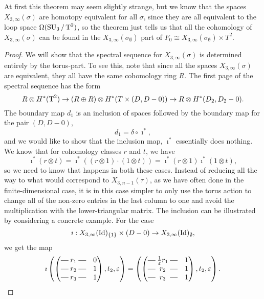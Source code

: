 At first this theorem may seem slightly strange, but we know
that the spaces $X_{3,\infty}(\sigma)$ are homotopy equivalent for all
$\sigma$, since they are all equivalent to the loop space
$\Omega(\operatorname{SU}_3/\operatorname{T}^2)$, so the theorem
just tells us that all the cohomology of $X_{3,\infty}(\sigma)$ can be
found in the $X_{3,\infty}(\sigma_{\emptyset})$ part of $F_0 \cong
X_{3,\infty}(\sigma_{\emptyset})\times T^2$.

\begin{proof}
  We will show that the spectral sequence for $X_{3,\infty}(\sigma)$
  is determined entirely by the torus-part. To see this, note that
  since all the spaces $X_{3,\infty}(\sigma)$ are equivalent, they all
  have the same cohomology ring $R$. The first page of the spectral
  sequence has the form
  \[ R \otimes H^*(\operatorname{T}^2) \to (R\oplus R)\otimes H^*(T\times (D,D-0))
  \to R\otimes H^*(D_2,D_2-0). \]
  The boundary map $d_1$ is an inclusion of spaces
  followed by the boundary map for the pair $(D,D-0)$,
  \[ d_1 = \delta \circ \imath^*, \]
  and we would like to show that the inclusion map, $\imath^*$
  essentially does nothing. We know that for cohomology classes $r$
  and $t$, we have
  \[ \imath^*(r \otimes t) = \imath^*((r\otimes 1)\cdot (1\otimes t))
  = \imath^*(r\otimes 1) \imath^*(1\otimes t), \]
  so we need to know that happens in both these cases. Instead of
  reducing all the way to what would correspond to $X_{3,n-1}(\tau)$,
  as we have often done in the finite-dimensional case, it is in this
  case simpler to only use
  the torus action to change all of
  the non-zero entries in the last column to one and avoid the
  multiplication with the lower-triangular matrix. The inclusion
  can be illustrated by considering a concrete example. For the
  case
  \[\imath : X_{3,\infty}(\operatorname{Id})_{\left\{ 1 \right\}}\times(D-0) \to
  X_{3,\infty}(\operatorname{Id})_{\emptyset}, \]
  we get the map
  \[
  \imath\left(\begin{pmatrix}
      \matrow{r_1} & 0 \\
      \matrow{r_2} & 1 \\
      \matrow{r_3} & 1
    \end{pmatrix}, t_2, \varepsilon\right) = 
  \left(\begin{pmatrix}
      \matrow{\frac{1}{\varepsilon}r_1} & 1 \\
      \matrow{r_2} & 1 \\
      \matrow{r_3} & 1
    \end{pmatrix}, t_2,\varepsilon\right). \]
  

\end{proof}
